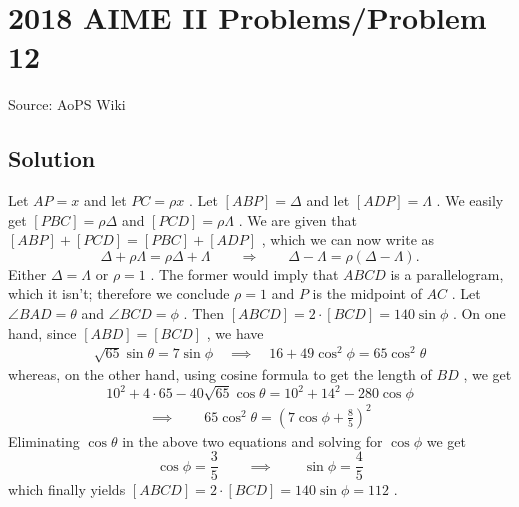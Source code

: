 \documentclass[12pt]{article}
\begin{document}
\section*{{2018 AIME II Problems/Problem 12}}
Source: AoPS Wiki

\subsection*{Solution}
Let $AP=x$ and let $PC=\rho x$ . Let $[ABP]=\Delta$ and let $[ADP]=\Lambda$ . We easily get $[PBC]=\rho \Delta$ and $[PCD]=\rho\Lambda$ . We are given that $[ABP] +[PCD] = [PBC]+[ADP]$ , which we can now write as \[\Delta + \rho\Lambda = \rho\Delta + \Lambda \qquad \Longrightarrow \qquad \Delta -\Lambda = \rho (\Delta -\Lambda).\] Either $\Delta = \Lambda$ or $\rho=1$ . The former would imply that $ABCD$ is a parallelogram, which it isn't; therefore we conclude $\rho=1$ and $P$ is the midpoint of $AC$ . Let $\angle BAD = \theta$ and $\angle BCD = \phi$ . Then $[ABCD]=2\cdot [BCD]=140\sin\phi$ . On one hand, since $[ABD]=[BCD]$ , we have \begin{align}\sqrt{65}\sin\theta = 7\sin\phi \quad \implies \quad 16+49\cos^2\phi = 65\cos^2\theta\end{align} whereas, on the other hand, using cosine formula to get the length of $BD$ , we get \[10^2+4\cdot 65 - 40\sqrt{65}\cos\theta = 10^2+14^2-280\cos\phi\] \begin{align}\tag{2}\implies \qquad 65\cos^2\theta = \left(7\cos\phi+ \frac{8}{5}\right)^2\end{align} Eliminating $\cos\theta$ in the above two equations and solving for $\cos\phi$ we get \[\cos\phi = \frac{3}{5}\qquad \implies \qquad \sin\phi = \frac{4}{5}\] which finally yields $[ABCD]=2\cdot [BCD] = 140\sin\phi = 112$ .
\end{document}
